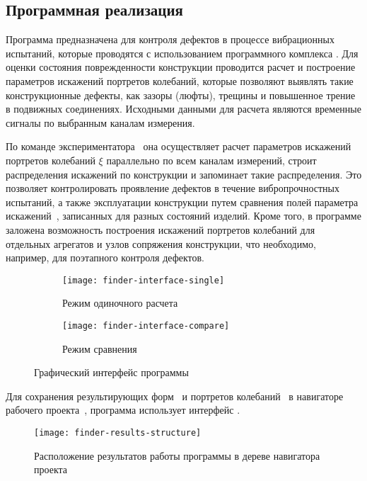 \subsection{Программная реализация}

Программа предназначена для контроля дефектов в процессе вибрационных испытаний, которые проводятся с использованием программного комплекса . Для оценки состояния поврежденности конструкции проводится расчет и построение параметров искажений портретов колебаний, которые позволяют выявлять такие конструкционные дефекты, как зазоры (люфты), трещины и повышенное трение в подвижных соединениях. Исходными данными для расчета являются временные сигналы по выбранным каналам измерения. 

По команде экспериментатора~ она осуществляет расчет параметров искажений портретов колебаний $ \xi $ параллельно по всем каналам измерений, строит распределения искажений по конструкции и запоминает такие распределения. Это позволяет контролировать проявление дефектов в течение вибропрочностных испытаний, а также эксплуатации конструкции путем сравнения полей параметра искажений~, записанных для разных состояний изделий. Кроме того, в программе заложена возможность построения искажений портретов колебаний для отдельных агрегатов и узлов сопряжения конструкции, что необходимо, например, для поэтапного контроля дефектов.

\begin{figure}[!htb]
	\centering
	\begin{subfigure}{0.49\textwidth}
		\texttt{[image: finder-interface-single]}
		\caption{Режим одиночного расчета} \label{subfig:finder-interface-single}
	\end{subfigure}
	\hfill
	\begin{subfigure}{0.49\textwidth}
		\texttt{[image: finder-interface-compare]} 
		\caption{Режим сравнения} \label{subfig:finder-interface-compare}
	\end{subfigure}
    \caption{Графический интерфейс программы} 
\end{figure}

Для сохранения результирующих форм~ и портретов колебаний~ в навигаторе рабочего проекта~, программа использует интерфейс .

\begin{figure}[H]
	\centerfloat
	\texttt{[image: finder-results-structure]}
	\caption{Расположение результатов работы программы в дереве навигатора проекта } \label{fig:finder-results-structure}
\end{figure}

